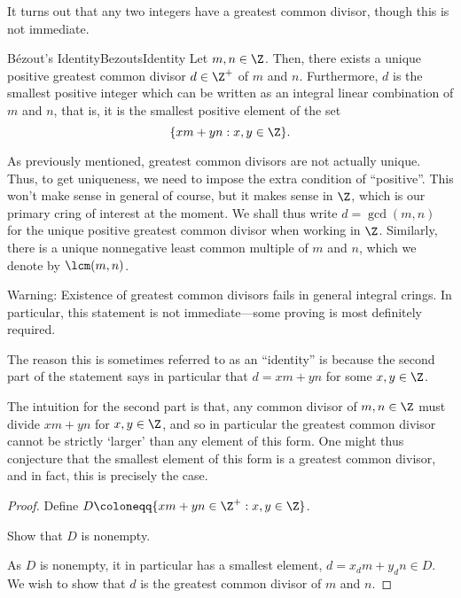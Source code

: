 It turns out that any two integers have a greatest common divisor, though this is not immediate.
\begin{thm}{B\'{e}zout's Identity}{BezoutsIdentity}
Let $m,n\in \Z$.  Then, there exists a unique positive greatest common divisor $d\in \Z ^+$ of $m$ and $n$.  Furthermore, $d$ is the smallest positive integer which can be written as an integral linear combination of $m$ and $n$, that is, it is the smallest positive element of the set
\begin{equation}
\{ xm+yn:x,y\in \Z \} .
\end{equation}
\begin{rmk}
As previously mentioned, greatest common divisors are not actually unique.  Thus, to get uniqueness, we need to impose the extra condition of ``positive''.  This won't make sense in general of course, but it makes sense in $\Z$, which is our primary cring of interest at the moment.  We shall thus write $d=\gcd (m,n)$ for the unique positive greatest common divisor when working in $\Z$.  Similarly, there is a unique nonnegative least common multiple of $m$ and $n$, which we denote by $\lcm (m,n)$.
\end{rmk}
\begin{wrn}
Warning:  Existence of greatest common divisors fails in general integral crings.  In particular, this statement is not immediate---some proving is most definitely required.
\end{wrn}
\begin{rmk}
The reason this is sometimes referred to as an ``identity'' is because the second part of the statement says in particular that $d=xm+yn$ for some $x,y\in \Z$.
\end{rmk}
\begin{rmk}
The intuition for the second part is that, any common divisor of $m,n\in \Z$ must divide $xm+yn$ for $x,y\in \Z$, and so in particular the greatest common divisor cannot be strictly `larger' than any element of this form.  One might thus conjecture that the smallest element of this form is a greatest common divisor, and in fact, this is precisely the case.
\end{rmk}
\begin{proof}
Define $D\coloneqq \{ xm+yn\in \Z ^+:x,y\in \Z \}$.
\begin{exr}{}{}
Show that $D$ is nonempty.
\end{exr}
As $D$ is nonempty, it in particular has a smallest element, $d=x_dm+y_dn\in D$.  We wish to show that $d$ is the greatest common divisor of $m$ and $n$.


\end{proof}
\end{thm}
